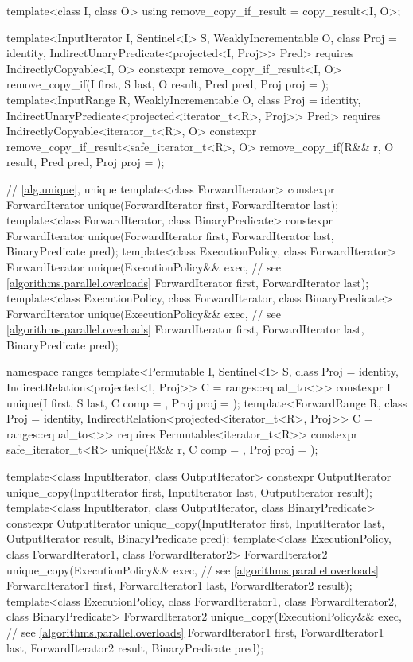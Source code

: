 \begin{codeblock}
{{    template<class I, class O>
    using remove_copy_if_result = copy_result<I, O>;

    template<InputIterator I, Sentinel<I> S, WeaklyIncrementable O,
        class Proj = identity, IndirectUnaryPredicate<projected<I, Proj>> Pred>
      requires IndirectlyCopyable<I, O>
      constexpr remove_copy_if_result<I, O>
        remove_copy_if(I first, S last, O result, Pred pred, Proj proj = {});
    template<InputRange R, WeaklyIncrementable O, class Proj = identity,
        IndirectUnaryPredicate<projected<iterator_t<R>, Proj>> Pred>
      requires IndirectlyCopyable<iterator_t<R>, O>
      constexpr remove_copy_if_result<safe_iterator_t<R>, O>
        remove_copy_if(R&& r, O result, Pred pred, Proj proj = {});
  }

  // \ref{alg.unique}, unique
  template<class ForwardIterator>
    constexpr ForwardIterator unique(ForwardIterator first, ForwardIterator last);
  template<class ForwardIterator, class BinaryPredicate>
    constexpr ForwardIterator unique(ForwardIterator first, ForwardIterator last,
                                     BinaryPredicate pred);
  template<class ExecutionPolicy, class ForwardIterator>
    ForwardIterator unique(ExecutionPolicy&& exec, // see \ref{algorithms.parallel.overloads}
                           ForwardIterator first, ForwardIterator last);
  template<class ExecutionPolicy, class ForwardIterator, class BinaryPredicate>
    ForwardIterator unique(ExecutionPolicy&& exec, // see \ref{algorithms.parallel.overloads}
                           ForwardIterator first, ForwardIterator last,
                           BinaryPredicate pred);

  namespace ranges {
    template<Permutable I, Sentinel<I> S, class Proj = identity,
        IndirectRelation<projected<I, Proj>> C = ranges::equal_to<>>
      constexpr I unique(I first, S last, C comp = {}, Proj proj = {});
    template<ForwardRange R, class Proj = identity,
        IndirectRelation<projected<iterator_t<R>, Proj>> C = ranges::equal_to<>>
      requires Permutable<iterator_t<R>>
      constexpr safe_iterator_t<R>
        unique(R&& r, C comp = {}, Proj proj = {});
  }

  template<class InputIterator, class OutputIterator>
    constexpr OutputIterator
      unique_copy(InputIterator first, InputIterator last,
                  OutputIterator result);
  template<class InputIterator, class OutputIterator, class BinaryPredicate>
    constexpr OutputIterator
      unique_copy(InputIterator first, InputIterator last,
                  OutputIterator result, BinaryPredicate pred);
  template<class ExecutionPolicy, class ForwardIterator1, class ForwardIterator2>
    ForwardIterator2
      unique_copy(ExecutionPolicy&& exec, // see \ref{algorithms.parallel.overloads}
                  ForwardIterator1 first, ForwardIterator1 last,
                  ForwardIterator2 result);
  template<class ExecutionPolicy, class ForwardIterator1, class ForwardIterator2,
           class BinaryPredicate>
    ForwardIterator2
      unique_copy(ExecutionPolicy&& exec, // see \ref{algorithms.parallel.overloads}
                  ForwardIterator1 first, ForwardIterator1 last,
                  ForwardIterator2 result, BinaryPredicate pred);

}
\end{codeblock}
